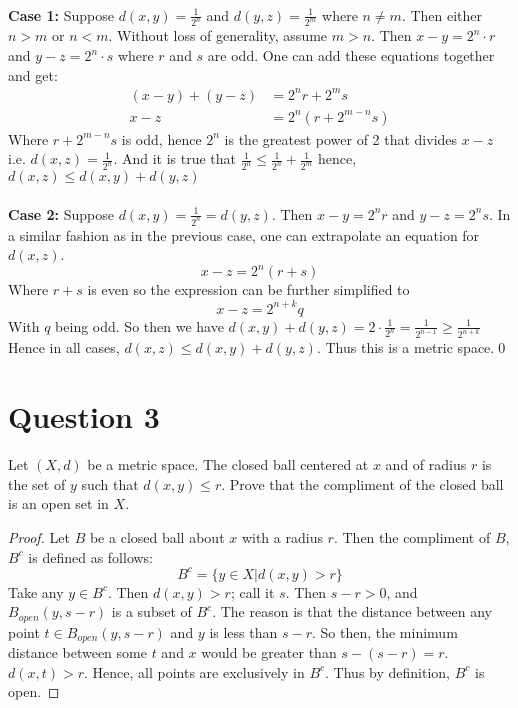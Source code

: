 \documentclass[12pt, letterpaper]{article}
\begin{document}
\\
\noindent\textbf{Case 1:} Suppose $d(x, y) = \frac{1}{2^n}$ and $d(y, z) = \frac{1}{2^m}$ where $n \neq m$. Then either $n > m$ or $n < m$. Without loss of generality, assume $m > n$.
Then $x - y = 2^n \cdot r$ and $y - z = 2^n \cdot s$ where $r$ and $s$ are odd. One can add these equations together and get:
\begin{align*}
  (x - y) + (y - z) &= 2^nr + 2^ms\\
  x - z &= 2^n(r + 2^{m-n}s)
\end{align*}
Where $r + 2^{m-n}s$ is odd, hence $2^n$ is the greatest power of 2 that divides $x - z$ i.e. $d(x, z) = \frac{1}{2^n}$. And it is true that $\frac{1}{2^n} \leq \frac{1}{2^n} + \frac{1}{2^m}$
hence, $d(x, z) \leq d(x, y) + d(y, z)$\\
\\
\noindent\textbf{Case 2:} Suppose $d(x, y) = \frac{1}{2^n} = d(y, z)$. Then $x - y = 2^nr$ and $y - z = 2^ns$. In a similar fashion as in the previous case, one can extrapolate an equation for $d(x, z)$.
$$ x - z = 2^n(r + s) $$
Where $r + s$ is even so the expression can be further simplified to
$$ x - z = 2^{n+k}q $$
With $q$ being odd. So then we have $d(x, y) + d(y, z) = 2 \cdot \frac{1}{2^n} = \frac{1}{2^{n - 1}} \geq \frac{1}{2^{n+k}}$ Hence in all cases, $d(x, z) \leq d(x, y) + d(y, z)$. Thus this is a metric space.\qed

\section*{Question 3}
Let $(X, d)$ be a metric space. The closed ball centered at $x$ and of radius $r$ is the set of $y$ such that $d(x, y) \leq r$. Prove that the compliment of the closed ball is an open set in $X$.
\begin{proof}
  Let $B$ be a closed ball about $x$ with a radius $r$. Then the compliment of $B$, $B^c$ is defined as follows:
  $$ B^c = \big\{ y \in X | d(x, y) > r \big\} $$
  Take any $y \in B^c$. Then $d(x, y) > r$; call it $s$. Then $s - r > 0$, and $B_{open}(y, s-r)$ is a subset of $B^c$. The reason is that the distance between any point $t \in B_{open}(y, s-r)$ and $y$
  is less than $s - r$. So then, the minimum distance between some $t$ and $x$ would be greater than $s - (s - r) = r$. $d(x, t) > r$. Hence, all points are exclusively in $B^c$. Thus by definition, $B^c$ is open.
\end{proof}
\end{document}
